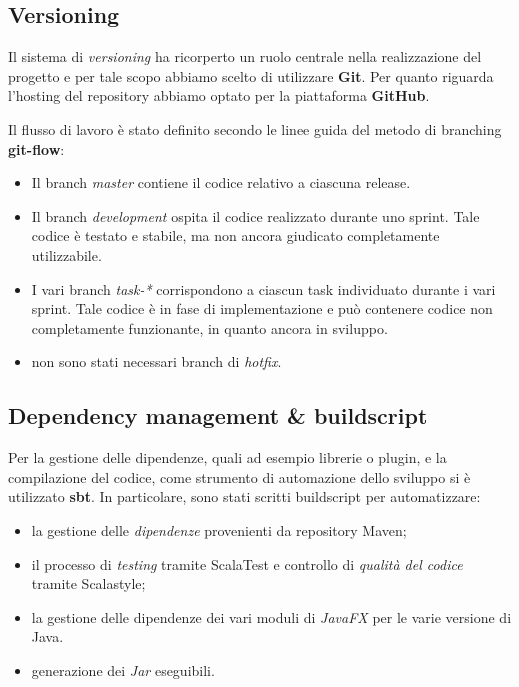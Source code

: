 \subsection{Versioning}\label{subsec:versioning}
Il sistema di \textit{versioning} ha ricorperto un ruolo centrale nella realizzazione del progetto e per tale scopo abbiamo scelto di utilizzare \textbf{Git}.
Per quanto riguarda l'hosting del repository abbiamo optato per la piattaforma \textbf{GitHub}.

Il flusso di lavoro è stato definito secondo le linee guida del metodo di branching \textbf{git-flow}:
\begin{itemize}
	\item Il branch \textit{master} contiene il codice relativo a ciascuna release.
	\item Il branch \textit{development} ospita il codice realizzato durante uno sprint. Tale codice è testato e stabile, ma non ancora giudicato completamente utilizzabile.
	\item I vari branch \textit{task-*} corrispondono a ciascun task individuato durante i vari sprint. Tale codice è in fase di implementazione e può contenere codice non completamente funzionante, in quanto ancora in sviluppo.
	\item non sono stati necessari branch di \textit{hotfix}.
\end{itemize}

\subsection{Dependency management \& buildscript}\label{subsec:build}

Per la gestione delle dipendenze, quali ad esempio librerie o plugin, e la compilazione del codice, come strumento di automazione dello sviluppo si è utilizzato \textbf{sbt}.
In particolare, sono stati scritti buildscript per automatizzare:

\begin{itemize}
    \item la gestione delle \textit{dipendenze} provenienti da repository Maven;
    \item il processo di \textit{testing} tramite ScalaTest e controllo di \textit{qualità del codice} tramite Scalastyle;
    \item la gestione delle dipendenze dei vari moduli di \textit{JavaFX} per le varie versione di Java.
    \item generazione dei \textit{Jar} eseguibili.
\end{itemize}

